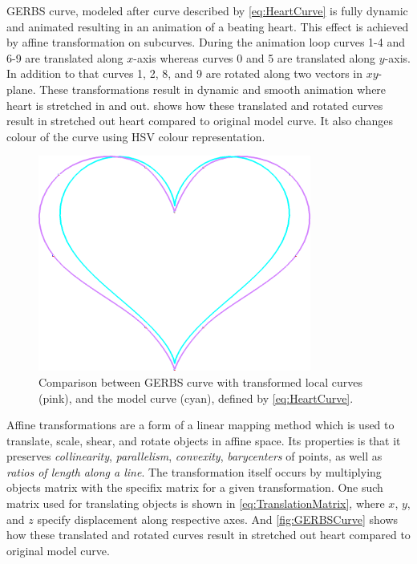 \documentclass[a4paper,12pt]{extarticle}
\begin{document}
GERBS curve, modeled after curve described by \cref{eq:HeartCurve} is fully dynamic and animated resulting in an animation of a beating heart. This effect is achieved by affine transformation on subcurves. During the animation loop curves 1-4 and 6-9 are translated along $x$-axis whereas curves 0 and 5 are translated along $y$-axis. In addition to that curves 1, 2, 8, and 9 are rotated along two vectors in $xy$-plane. These transformations result in dynamic and smooth animation where heart is stretched in and out.   shows how these translated and rotated curves result in stretched out heart compared to original model curve. It also changes colour of the curve using HSV colour representation.

\begin{figure}[H]
  \centering
  \includegraphics[width=0.8\textwidth]{CurveComparison.png}
  \caption{Comparison between GERBS curve with transformed local curves (pink), and the model curve (cyan), defined by \cref{eq:HeartCurve}.}
  \label{fig:CurveComparison}
\end{figure}

Affine transformations are a form of a linear mapping method which is used to translate, scale, shear, and rotate objects in affine space. Its properties is that it preserves \emph{collinearity}, \emph{parallelism}, \emph{convexity}, \emph{barycenters} of points, as well as \emph{ratios of length along a line}. The transformation itself occurs by multiplying objects matrix with the specifix matrix for a given transformation. One such matrix used for translating objects is shown in \cref{eq:TranslationMatrix}, where $x$, $y$, and $z$ specify displacement along respective axes. And \cref{fig:GERBSCurve} shows how these translated and rotated curves result in stretched out heart compared to original model curve.
\end{document}
